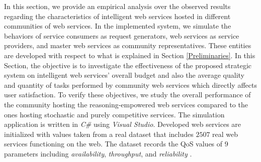 \documentclass[runningheads,a4paper]{llncs}
\begin{document}
In this section, we provide an empirical analysis over the
observed results regarding the characteristics of intelligent web
services hosted in different communities of web services. In the
implemented system, we simulate the behaviors of service consumers
as request generators, web services as service providers, and
master web services as community representatives. These entities
are developed with respect to what is explained in Section
\ref{Preliminaries}. In this Section, the objective is to investigate the
effectiveness of the proposed strategic system on intelligent
web services' overall budget and also the average quality and quantity of tasks performed by 
community web services which directly affects user satisfaction. 
To verify these objectives, we study the overall performance of the community hosting the
reasoning-empowered web services compared to the ones hosting
stochastic and purely competitive services. The simulation
application is written in \textit{C\#} using \textit{Visual Studio}. 
Developed web services are initialized with values taken
from a real dataset that includes $2507$ real web services
functioning on the web. The dataset records the QoS values of $9$
parameters including \textit{availability}, \textit{throughput},
and
\textit{reliability} \cite{Almasri}.  %
\end{document}
